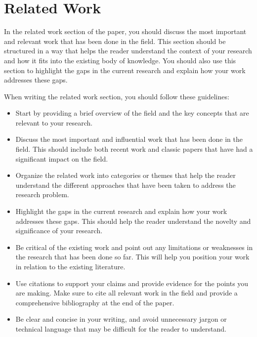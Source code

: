 \section{Related Work}

In the related work section of the paper, you should discuss the most important and relevant work that has been done in the field. This section should be structured in a way that helps the reader understand the context of your research and how it fits into the existing body of knowledge. You should also use this section to highlight the gaps in the current research and explain how your work addresses these gaps.

When writing the related work section, you should follow these guidelines:

\begin{itemize}
\item Start by providing a brief overview of the field and the key concepts that are relevant to your research.
\item Discuss the most important and influential work that has been done in the field. This should include both recent work and classic papers that have had a significant impact on the field.
\item Organize the related work into categories or themes that help the reader understand the different approaches that have been taken to address the research problem.
\item Highlight the gaps in the current research and explain how your work addresses these gaps. This should help the reader understand the novelty and significance of your research.
\item Be critical of the existing work and point out any limitations or weaknesses in the research that has been done so far. This will help you position your work in relation to the existing literature.
\item Use citations to support your claims and provide evidence for the points you are making. Make sure to cite all relevant work in the field and provide a comprehensive bibliography at the end of the paper.
\item Be clear and concise in your writing, and avoid unnecessary jargon or technical language that may be difficult for the reader to understand.
\end{itemize}

